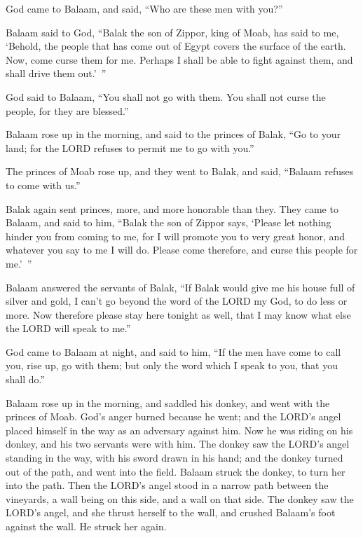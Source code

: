 \myverse{}God came to Balaam, and said, “Who are these men with you?”


\myverse{}Balaam said to God, “Balak the son of Zippor, king of Moab,
has said to me,
\myverse{}‘Behold, the people that has come out of Egypt covers the surface of the
earth. Now, come curse them for me. Perhaps I shall be able to fight against them, and shall drive them
out.’ ”


\myverse{}God said to Balaam, “You shall not go with them. You shall not
curse the people, for they are blessed.”


\myverse{}Balaam rose up in the morning, and said to the princes of Balak,
“Go to your land; for the LORD refuses to permit me to go with you.”


\myverse{}The princes of Moab rose up, and they went to Balak, and said,
“Balaam refuses to come with us.”


\myverse{}Balak again sent princes, more, and more honorable than they.
\myverse{}They came to Balaam, and said to him, “Balak the son of Zippor says, ‘Please
let nothing hinder you from coming to me,
\myverse{}for I will promote you to very great honor, and whatever you say to me I
will do. Please come therefore, and curse this people for me.’ ”


\myverse{}Balaam answered the servants of Balak, “If Balak would give
me his house full of silver and gold, I can’t go beyond the word of the LORD my God, to do less or more.
\myverse{}Now therefore please stay here tonight as well, that I may know what else
the LORD will speak to me.”


\myverse{}God came to Balaam at night, and said to him, “If the men have
come to call you, rise up, go with them; but only the word which I speak to you, that you shall do.”


\myverse{}Balaam rose up in the morning, and saddled his donkey, and went
with the princes of Moab.
\myverse{}God’s anger burned because he went; and the LORD’s angel placed himself in
the way as an adversary against him. Now he was riding on his donkey, and his two servants were with him.
\myverse{}The donkey saw the LORD’s angel standing in the way, with his sword drawn
in his hand; and the donkey turned out of the path, and went into the field. Balaam struck the donkey,
to turn her into the path.
\myverse{}Then the LORD’s angel stood in a narrow path between the vineyards, a wall
being on this side, and a wall on that side.
\myverse{}The donkey saw the LORD’s angel, and she thrust herself to the wall, and
crushed Balaam’s foot against the wall. He struck her again.


